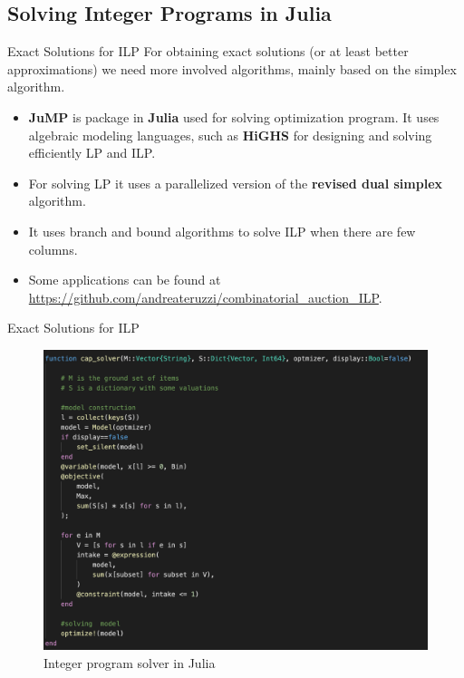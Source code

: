 \documentclass[aspectratio=169,xcolor=dvipsnames]{beamer}
\begin{document}
    \subsection{Solving Integer Programs in Julia}
    \begin{frame}{Exact Solutions for ILP}
    For obtaining exact solutions (or at least better approximations) we need more involved algorithms, mainly based on the simplex algorithm.  
    \vspace{10pt}

    \begin{itemize}
        \item \textbf{JuMP} is package in \textbf{Julia} used for solving optimization program. It uses algebraic modeling languages, such as \textbf{HiGHS} for designing and solving efficiently LP and ILP.
        
        \item For solving LP it uses a parallelized version of the  \textbf{revised dual simplex} algorithm.

        \item It uses branch and bound algorithms to solve ILP when there are few columns.

        \item Some applications can be found at \url{https://github.com/andreateruzzi/combinatorial_auction_ILP}.
    \end{itemize}
 
    \end{frame}
     \begin{frame}{Exact Solutions for ILP}
     \begin{figure}
        \includegraphics[width=1\textwidth, height=0.7\textheight, keepaspectratio]{utilities/cap_solver.png}
        \caption{Integer program solver in Julia} \label{fig:3}
    \end{figure}
     
     \end{frame}
\end{document}
